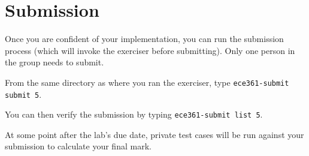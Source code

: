 \documentclass[11pt]{article}
\def\thelab{5}
\begin{document}



\section{Submission}
\label{sec:submission}
Once you are confident of your implementation, you can run the submission process (which will invoke the exerciser before submitting).
Only one person in the group needs to submit.

From the same directory as where you ran the exerciser, type \texttt{ece361-submit submit \thelab}.

You can then verify the submission by typing \texttt{ece361-submit list \thelab}.

At some point after the lab's due date, private test cases will be run against your submission to calculate your final mark.
\end{document}
